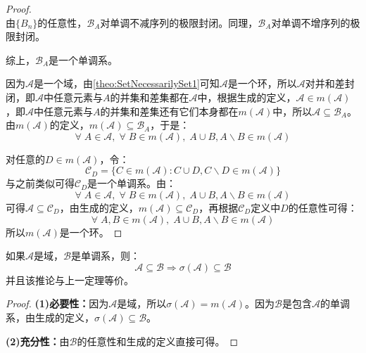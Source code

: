 \begin{proof}
\begin{equation*}
	\end{equation*}
	由$\{B_n\}$的任意性，$\mathscr{B}_A$对单调不减序列的极限封闭。同理，$\mathscr{B}_A$对单调不增序列的极限封闭。\par
	综上，$\mathscr{B}_A$是一个单调系。\par
	因为$\mathscr{A}$是一个域，由\cref{theo:SetNecessarilySet1}可知$\mathscr{A}$是一个环，所以$\mathscr{A}$对并和差封闭，即$\mathscr{A}$中任意元素与$A$的并集和差集都在$\mathscr{A}$中，根据生成的定义，$\mathscr{A}\in m(\mathscr{A})$，即$\mathscr{A}$中任意元素与$A$的并集和差集还有它们本身都在$m(\mathscr{A})$中，所以$\mathscr{A}\subseteq\mathscr{B}_A$。由$m(\mathscr{A})$的定义，$m(\mathscr{A})\subseteq\mathscr{B}_A$，于是：
	\begin{equation*}
		\forall\;A\in \mathscr{A},\;\forall\;B\in m(\mathscr{A}),\; A\cup B,A\backslash B\in m(\mathscr{A})
	\end{equation*}\par
	对任意的$D\in m(\mathscr{A})$，令：
	\begin{equation*}
		\mathscr{C}_D=\{C\in m(\mathscr{A}):C\cup D,C\backslash D\in m(\mathscr{A})\}
	\end{equation*}
	与之前类似可得$\mathscr{C}_D$是一个单调系。由：
	\begin{equation*}
		\forall\;A\in \mathscr{A},\;\forall\;B\in m(\mathscr{A}),\;A\cup B,A\backslash B\in m(\mathscr{A})
	\end{equation*}
	可得$\mathscr{A}\subseteq\mathscr{C}_D$，由生成的定义，$m(\mathscr{A})\subseteq\mathscr{C}_D$，再根据$\mathscr{C}_D$定义中$D$的任意性可得：
	\begin{equation*}
		\forall\;A,B\in m(\mathscr{A}),\;A\cup B,A\backslash B\in m(\mathscr{A})
	\end{equation*}
	所以$m(\mathscr{A})$是一个环。
\end{proof}
\begin{corollary}\label{cor:SigmaField=MonotoneField}
	如果$\mathscr{A}$是域，$\mathscr{B}$是单调系，则：
	\begin{equation*}
		\mathscr{A}\subseteq\mathscr{B}\Rightarrow\sigma(\mathscr{A})\subseteq\mathscr{B}
	\end{equation*}
	并且该推论与上一定理等价。
\end{corollary}
\begin{proof}
	\textbf{(1)必要性：}因为$\mathscr{A}$是域，所以$\sigma(\mathscr{A})=m(\mathscr{A})$。因为$\mathscr{B}$是包含$\mathscr{A}$的单调系，由生成的定义，$\sigma(\mathscr{A})\subseteq\mathscr{B}$。\par
	\textbf{(2)充分性：}由$\mathscr{B}$的任意性和生成的定义直接可得。
\end{proof}
